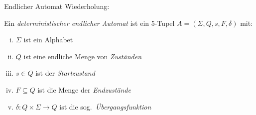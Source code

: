 \documentclass[xcolor=dvipsnames, aspectratio=169]{beamer}
\begin{document}

\begin{frame}{Endlicher Automat}
Wiederholung:\medskip

\begin{defi}
Ein \emph{deterministischer endlicher Automat} ist ein 5-Tupel $A=(\Sigma, Q, s, F, \delta)$ mit:
\begin{enumerate}[(i)]
\item $\Sigma$ ist ein Alphabet
\item $Q$ ist eine endliche Menge von \emph{Zuständen}
\item $s\in Q$ ist der \emph{Startzustand}
\item $F\subseteq Q$ ist die Menge der \emph{Endzustände} 
\item $\delta\colon Q\times\Sigma\to Q$ ist die sog.\ \emph{Übergangsfunktion}
\end{enumerate}
\end{defi}
\end{frame}
\end{document}
